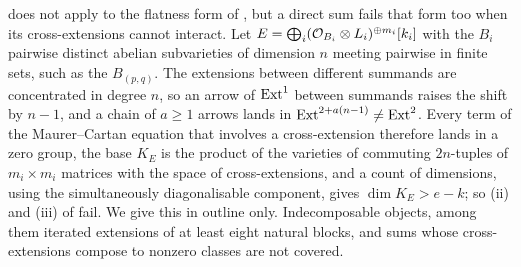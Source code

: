\begin{remark}\label{rem:flatsums}
 does not apply to the flatness form of
, but a direct sum fails that form too when its
cross-extensions cannot interact. Let $E=\bigoplus_{i}(\mathcal{O}_{B_{i}}\otimes
L_{i})^{\oplus m_{i}}[k_{i}]$ with the $B_{i}$ pairwise distinct abelian
subvarieties of dimension $n$ meeting pairwise in finite sets, such as the
$B_{(p,q)}$. The extensions between different summands are concentrated in
degree $n$, so an arrow of $\operatorname{Ext}^{1}$ between summands raises the shift by
$n-1$, and a chain of $a\ge1$ arrows lands in $\operatorname{Ext}^{2+a(n-1)}\ne\operatorname{Ext}^{2}$.
Every term of the Maurer--Cartan equation that involves a cross-extension
therefore lands in a zero group, the base $K_{E}$ is the product of the
varieties of commuting $2n$-tuples of $m_{i}\times m_{i}$ matrices with the
space of cross-extensions, and a count of dimensions, using the
simultaneously diagonalisable component, gives $\dim K_{E}>e-k$; so (ii) and
(iii) of  fail. We give this in outline only. Indecomposable objects,
among them iterated extensions of at least eight natural blocks, and sums
whose cross-extensions compose to nonzero classes are not covered.
\end{remark}
